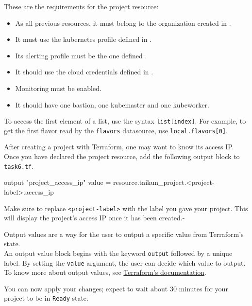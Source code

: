 These are the requirements for the project resource:
\begin{itemize}
  \item As all previous resources, it must belong to the organization created in .
  \item It must use the kubernetes profile defined in .
  \item Its alerting profile must be the one defined .
  \item It should use the cloud credentials defined in .
  \item Monitoring must be enabled.
  \item It should have one bastion, one kubemaster and one kubeworker.
\end{itemize}

\begin{tip}
  To access the first element of a list, use the syntax \texttt{list[index]}.
  For example, to get the first flavor read by the \texttt{flavors} datasource,
  use \texttt{local.flavors[0]}.
\end{tip}
\pagebreak

After creating a project with Terraform, one may want to know its access IP.
Once you have declared the project resource, add the following output block to \texttt{task6.tf}.
\begin{tf}
output "project_access_ip" {
  value = resource.taikun_project.<project-label>.access_ip
}
\end{tf}
Make sure to replace \texttt{<project-label>} with the label you gave your project.
This will display the project's access IP once it has been created.-
\begin{tip}
Output values are a way for the user to output a specific value from Terraform's state.\\

An output value block begins with the keyword \texttt{output} followed by a unique label.
By setting the \texttt{value} argument, the user can decide which value to output.\\

To know more about output values, see 
\href{https://www.terraform.io/docs/language/values/outputs.html}{Terraform's documentation}.
\end{tip}

You can now apply your changes;
expect to wait about 30 minutes for  your project to be in \texttt{Ready}
state.

